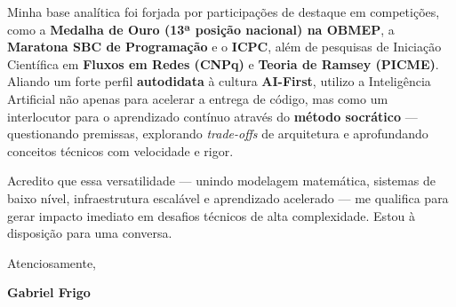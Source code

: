 \documentclass[letterpaper,10pt]{article}
\begin{document}
Minha base analítica foi forjada por participações de destaque em competições, como a \textbf{Medalha de Ouro (13ª posição nacional) na OBMEP}, a \textbf{Maratona SBC de Programação} e o \textbf{ICPC}, além de pesquisas de Iniciação Científica em \textbf{Fluxos em Redes (CNPq)} e \textbf{Teoria de Ramsey (PICME)}. Aliando um forte perfil \textbf{autodidata} à cultura \textbf{AI-First}, utilizo a Inteligência Artificial não apenas para acelerar a entrega de código, mas como um interlocutor para o aprendizado contínuo através do \textbf{método socrático} — questionando premissas, explorando \textit{trade-offs} de arquitetura e aprofundando conceitos técnicos com velocidade e rigor.

Acredito que essa versatilidade — unindo modelagem matemática, sistemas de baixo nível, infraestrutura escalável e aprendizado acelerado — me qualifica para gerar impacto imediato em desafios técnicos de alta complexidade. Estou à disposição para uma conversa.

Atenciosamente,

\textbf{Gabriel Frigo}
\end{document}
